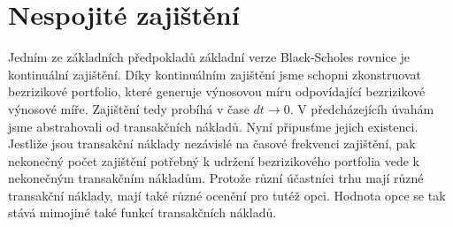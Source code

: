 \documentclass[a4paper]{book}
\begin{document}
\section{Nespojité zajištění}

Jedním ze základních předpokladů základní verze Black-Scholes rovnice je kontinuální zajištění. Díky kontinuálním zajištění jsme schopni zkonstruovat bezrizikové portfolio, které generuje výnosovou míru odpovídající bezrizikové výnosové míře. Zajištění tedy probíhá v čase $dt \rightarrow 0$. V předcházejícíh úvahám jsme abstrahovali od transakčních nákladů. Nyní připusťme jejich existenci. Jestliže jsou transakční náklady nezávislé na časové frekvenci zajištění, pak nekonečný počet zajištění potřebný k udržení bezrizikového portfolia vede k nekonečným transakčním nákladům. Protože různí účastníci trhu mají různé transakční náklady, mají také různé ocenění pro tutéž opci. Hodnota opce se tak stává mimojiné také funkcí transakčních nákladů.
\end{document}

